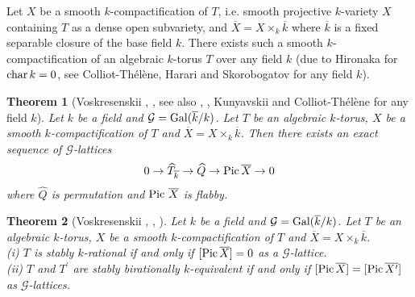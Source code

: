 \documentclass{amsart}
\theoremstyle{plain}
\newtheorem{theorem}{Theorem}[section]
\theoremstyle{definition}
\theoremstyle{remark}
\newcounter{sub}\def\tr{\mbox{tr }}
\begin{document}
Let $X$ be a smooth $k$-compactification of $T$, 
i.e. smooth projective $k$-variety $X$ 
containing $T$ as a dense open subvariety, 
and $\overline{X}=X\times_k\overline{k}$ 
where $\overline{k}$ is a fixed separable closure of the base field $k$. 
There exists such a smooth $k$-compactification of an algebraic $k$-torus $T$ 
over any field $k$ (due to Hironaka \cite{Hir64} for ${\rm char}\, k=0$, 
see Colliot-Th\'{e}l\`{e}ne, Harari and Skorobogatov 
\cite[Corollaire 1]{CTHS05} for any field $k$). 

\begin{theorem}[{Voskresenskii \cite[Section 4, page 1213]{Vos69}, \cite[Section 3, page 7]{Vos70}, see also \cite{Vos74}, \cite[Section 4.6]{Vos98}, Kunyavskii \cite[Theorem 1.9]{Kun07} and Colliot-Th\'el\`ene \cite[Theorem 5.1, page 19]{CT07} for any field $k$}]\label{thVos69}
Let $k$ be a field 
and $\mathcal{G}={\rm Gal}(\overline{k}/k)$. 
Let $T$ be an algebraic $k$-torus, 
$X$ be a smooth $k$-compactification of $T$ 
and $\overline{X}=X\times_k\overline{k}$. 
Then there exists an exact sequence of $\mathcal{G}$-lattices 
\begin{align*}
0\to \widehat{T}_{\overline{k}}\to \widehat{Q}\to {\rm Pic}\,\overline{X}\to 0%
\end{align*}
where %
$\widehat{Q}$ is permutation 
and ${\rm Pic}\ \overline{X}$ is flabby. 
\end{theorem}
%

\begin{theorem}[{Voskresenskii \cite[Theorem 1]{Vos70}, \cite[Theorem 3]{Vos73}, \cite[Chapter 2]{Vos98}}]\label{thVos70} 
Let $k$ be a field and $\mathcal{G}={\rm Gal}(\overline{k}/k)$.
Let $T$ %
be an algebraic $k$-torus, 
$X$ be a smooth $k$-compactification of $T$ 
and $\overline{X}=X\times_k\overline{k}$.\\
{\rm (i)} $T$ is stably $k$-rational if and only if 
$[{\rm Pic}\,\overline{X}]=0$ as a $\mathcal{G}$-lattice.\\
{\rm (ii)} $T$ and $T^\prime$ are stably birationally $k$-equivalent 
if and only if $[{\rm Pic}\,\overline{X}]=[{\rm Pic}\,\overline{X^\prime}]$ 
as $\mathcal{G}$-lattices.
\end{theorem}
\end{document}
